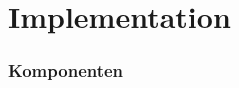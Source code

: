 
\section{Implementation}
\label{sec:Implementation}

\subsubsection{Komponenten}
\label{subsub:impl_Komponenten}


